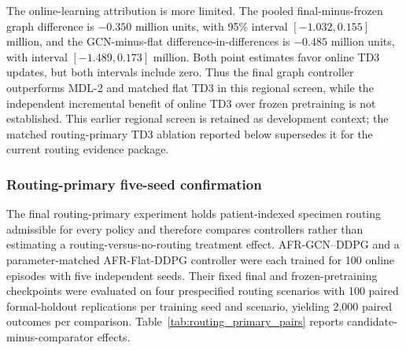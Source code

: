 \documentclass[preprint,review,12pt]{elsarticle}
\begin{document}
The online-learning attribution is more limited. The pooled final-minus-frozen
graph difference is $-0.350$ million units, with 95\% interval
$[-1.032,0.155]$ million, and the GCN-minus-flat difference-in-differences is
$-0.485$ million units, with interval $[-1.489,0.173]$ million. Both point
estimates favor online TD3 updates, but both intervals include zero. Thus the
final graph controller outperforms MDL-2 and matched flat TD3 in this regional
screen, while the independent incremental benefit of online TD3 over frozen
pretraining is not established. This earlier regional screen is retained as
development context; the matched routing-primary TD3 ablation reported below
supersedes it for the current routing evidence package.

\subsubsection{Routing-primary five-seed confirmation}
\label{sec:routing_primary_confirmation}

The final routing-primary experiment holds patient-indexed specimen routing
admissible for every policy and therefore compares controllers rather than
estimating a routing-versus-no-routing treatment effect. AFR-GCN--DDPG and a
parameter-matched AFR-Flat-DDPG controller were each trained for 100 online
episodes with five independent seeds. Their fixed final and frozen-pretraining
checkpoints were evaluated on four prespecified routing scenarios with 100
paired formal-holdout replications per training seed and scenario, yielding
2,000 paired outcomes per comparison. Table~\ref{tab:routing_primary_pairs}
reports candidate-minus-comparator effects.

\begin{table}[htbp]
\centering
\caption{Formal routing-primary paired comparisons. Objective differences and
intervals are in millions of modeled weighted-objective units. Negative cost,
patients-lost, and manufacturing-ineligibility differences and positive
completion differences favor the candidate.}
\label{tab:routing_primary_pairs}
\end{table}
\end{document}
